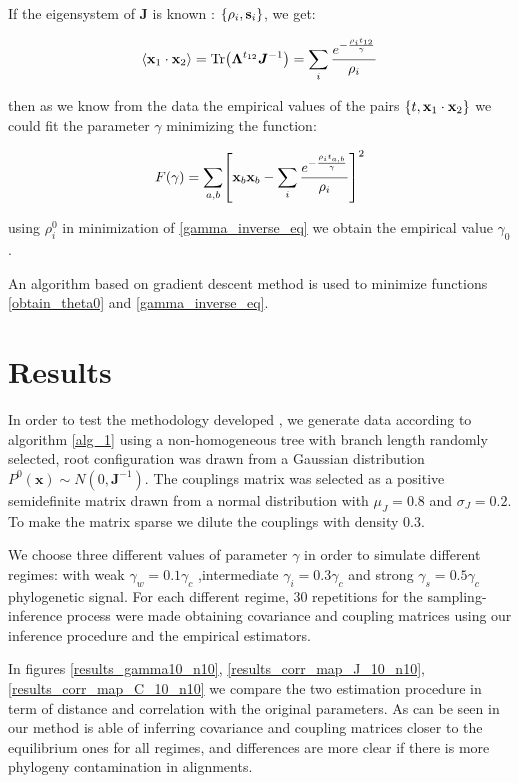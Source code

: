 \documentclass[reprint,amsmath,amssymb,superscriptaddress,showpacs,pre]{revtex4-1}
\let\originalleft\left
\let\originalright\right
\renewcommand{\left}{\mathopen{}\mathclose\bgroup\originalleft}
\renewcommand{\right}{\aftergroup\egroup\originalright}
\DeclareMathOperator{\Tr}{Tr}
\begin{document}
If the eigensystem of $\bm J$ is known : $\left\lbrace\rho_i, \mathbf{s}_i\right\rbrace $, we get:

\begin{equation}
\left\langle \mathbf{ x}_1\cdot\mathbf{ x}_2\right\rangle =\Tr \left(\bm \Lambda^{t_{12} } \bm J^{-1}\right) =\sum_{i} \frac{ e^{-\frac{\rho_i t_{12}}{\gamma}}}{\rho_i}
\end{equation}


then as we know from the data the empirical values of the pairs $\left\lbrace t,\mathbf{ x}_1\cdot\mathbf{x}_2 \right\rbrace $ we could fit the parameter $\gamma$ minimizing the  function:

\begin{equation}
F(\gamma)=\sum_{a,b}\left[\mathbf{ x}_b\mathbf{ x}_b -\sum_{i} \frac{e^{-\frac{\rho_i t_{a,b}}{\gamma}}}{\rho_i}\right] ^2
\label{gamma_inverse_eq}
\end{equation}

using $\rho_i^0$ in minimization of \ref{gamma_inverse_eq} we obtain the empirical value $\gamma_0$.

An algorithm based on gradient descent method is used  to minimize functions \ref{obtain_theta0} and \ref{gamma_inverse_eq}.
\section{ Results}
\label{Results}
In order to test the methodology developed , we generate  data according to algorithm \ref{alg_1} using a non-homogeneous tree with branch length randomly selected,  root configuration was drawn from a Gaussian distribution $P^0(\mathbf{ x})\sim N(0,\bm J^{-1})$. The couplings matrix was selected as a positive semidefinite matrix drawn from a normal distribution with $\mu_J=0.8$ and $\sigma_{J}=0.2$. To make the matrix sparse we dilute the couplings with density $0.3$. 

We choose three different values of parameter $\gamma$ in order to simulate  different regimes: with weak  $\gamma_w=0.1\gamma_c$ ,intermediate $\gamma_i=0.3\gamma_c$ and  strong  $\gamma_s=0.5\gamma_c$  phylogenetic signal. For each different  regime, $30$ repetitions  for the sampling-inference process were made obtaining covariance and coupling matrices using our inference procedure and the empirical estimators.

In figures \ref{results_gamma10_n10},  \ref{results_corr_map_J_10_n10}, \ref{results_corr_map_C_10_n10} we compare the two estimation procedure in term of distance and correlation with the original parameters. As can be seen in   our method is able of inferring covariance and  coupling matrices closer to the equilibrium ones for all regimes, and  differences are more clear if there is more phylogeny contamination in  alignments. 
\end{document}
